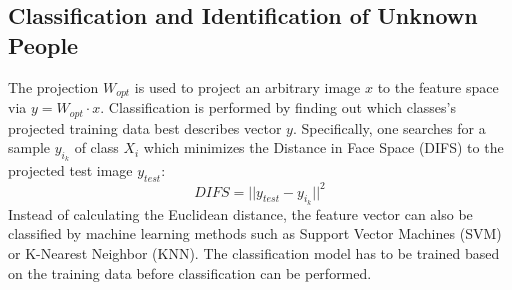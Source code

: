 \subsection{Classification and Identification of Unknown People}
\label{ssec:IdentificationUnknown}
The projection $W_{opt}$ is used to project an arbitrary image $x$ to the feature space via $y=W_{opt} \cdot x$. 
Classification is performed by finding out which classes's projected training data best describes vector $y$. %
Specifically, one searches for a sample $y_{i_k}$ of class $X_i$ which minimizes the Distance in Face Space (DIFS) to the projected test image $y_{test}$: %
\begin{equation}
  \label{eqn:DIFS}
  DIFS=||y_{test}-y_{i_k}||^2
\end{equation}
Instead of calculating the Euclidean distance, the feature vector can also be classified by machine learning methods such as Support Vector Machines (SVM) or K-Nearest Neighbor (KNN).
The classification model has to be trained based on the training data before classification can be performed.

